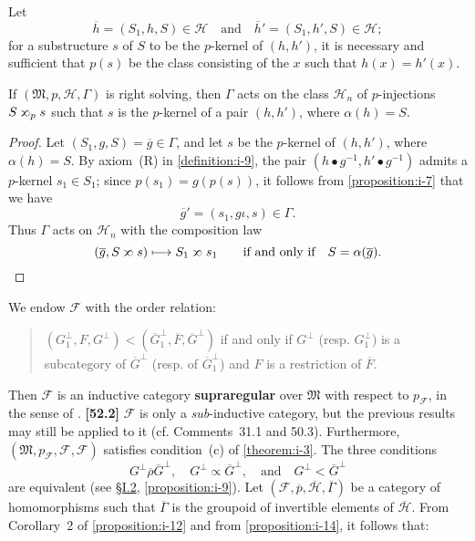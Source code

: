 \documentclass[a4paper,fleqn]{article}
\theoremstyle{plain}
\newenvironment{proposition}[1]
  {\renewcommand\theinnerproposition{#1}\innerproposition}
  {\endinnerproposition}
\theoremstyle{definition}
\newenvironment{longcomm}[1]
  {\noindent\textbf{[#1]}\rmfamily}
  {}
\newcommand{\unsure}[1]{{\color{purple}\textbf{#1}}}
\newcommand{\textand}{\quad\text{and}\quad}
\newcommand{\HH}{\mathcal{H}}
\newcommand{\bHH}{\overline{\HH}}
\newcommand{\MM}{\mathfrak{M}}
\newcommand{\FF}{\mathcal{F}}
\newcommand{\relrhobar}{\mathrel{\overline{\rho}}}
\newcommand{\subs}{\mathrel{\propto}}
\newcommand{\sups}{\mathrel{\reflectbox{$\propto$}}}
\begin{document}
Let
\[
  \overline{h} = (S_1,h,S)\in\HH
  \textand
  \overline{h}' = (S_1,h',S)\in\HH;
\]
for a substructure $s$ of $S$ to be the $p$-kernel of $(h,h')$, it is necessary and sufficient that $p(s)$ be the class consisting of the $x$ such that $h(x)=h'(x)$.

\begin{proposition}{16}
\label{proposition:i-16}
  If $(\MM,p,\HH,\Gamma)$ is right solving, then $\Gamma$ acts on the class $\HH_n$ of $p$-injections $S\sups_p s$ such that $s$ is the $p$-kernel of a pair $(h,h')$, where $\alpha(h)=S$.
\end{proposition}

\begin{proof}
  Let $(S_1,g,S)=\overline{g}\in\Gamma$, and let $s$ be the $p$-kernel of $(h,h')$, where $\alpha(h)=S$.
  By axiom~(R) in \cref{definition:i-9}, the pair $(h\bullet g^{-1},h'\bullet g^{-1})$ admits a $p$-kernel $s_1\in S_1$;
  since $p(s_1)=g(p(s))$, it follows from \cref{proposition:i-7} that we have
  \[
    \overline{g}' = (s_1,g\iota,s)
    \in\Gamma.
  \]
  Thus $\Gamma$ acts on $\HH_n$ with the composition law
  \[
    (\overline{g},S\sups s)
    \longmapsto S_1\sups s_1
    \qquad\text{if and only if}\quad
    S=\alpha(\overline{g}).
    \qedhere
  \]
\end{proof}

We endow $\FF$ with the order relation:
\begin{quote}
  $(G_1^\perp,F,G^\perp)<(\overline{G}_1^\perp,\overline{F},\overline{G}^\perp)$
  \qquad if and only if\quad
  $G^\perp$ (resp. $G_1^\perp$) is a subcategory of $\overline{G}^\perp$ (resp. of $\overline{G}_1^\perp$) and $F$ is a restriction of $\overline{F}$.
\end{quote}

Then $\FF$ is an inductive category \unsure{supraregular} over $\MM$ with respect to $p_\FF$, in the sense of \cite{3c}.
\begin{longcomm}{52.2}
  $\FF$ is only a \emph{sub}-inductive category, but the previous results may still be applied to it (cf. Comments~31.1 and 50.3).
\end{longcomm}
Furthermore, $(\MM,p_\FF,\FF,\FF)$ satisfies condition~(c) of \cref{theorem:i-3}.
The three conditions
\[
  G^\perp\relrhobar\overline{G}^\perp,
  \quad G^\perp\subs\overline{G}^\perp,
  \textand G^\perp<\overline{G}^\perp
\]
are equivalent (see \hyperref[section:ii]{§I.2}, \cref{proposition:i-9}).
Let $(\FF,\overline{p},\bHH,\overline{\Gamma})$ be a category of homomorphisms such that $\overline{\Gamma}$ is the groupoid of invertible elements of $\bHH$.
From Corollary~2 of \cref{proposition:i-12} and from \cref{proposition:i-14}, it follows that:
\end{document}
